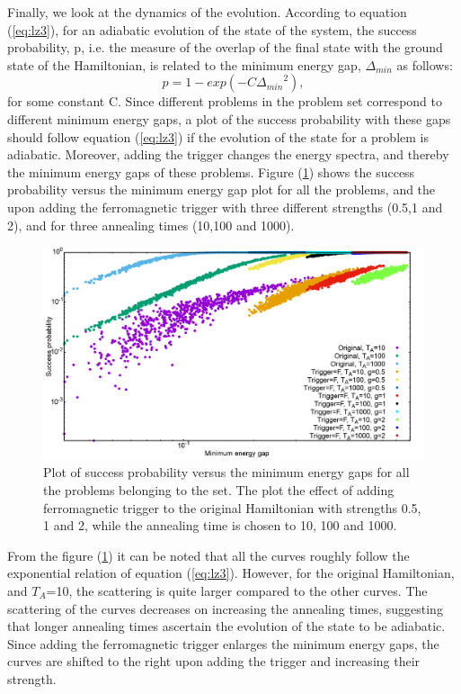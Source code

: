\documentclass[12]{article}
\begin{document}
Finally, we look at the dynamics of the evolution. According to equation (\ref{eq:lz3}), for an adiabatic evolution of the state of the system, the success probability, p, i.e. the measure of the overlap of the final state with the ground state of the Hamiltonian, is related to the minimum energy gap, $\Delta_{min}$ as follows:
\begin{equation}
p=1-exp(-C{\Delta_{min}}^2),
\end{equation}
for some constant C. Since different problems in the problem set correspond to different minimum energy gaps, a plot of the success probability with these gaps should follow equation (\ref{eq:lz3}) if the evolution of the state for a problem is adiabatic. Moreover, adding the trigger changes the energy spectra, and thereby the minimum energy gaps of these problems. Figure (\ref{fig:f14}) shows the success probability versus the minimum energy gap plot for all the problems, and the upon adding the ferromagnetic trigger with three different strengths (0.5,1 and 2), and for three annealing times (10,100 and 1000).

\begin{figure}[H]
\centering
\includegraphics[scale=0.3]{SuccVsGap_OF_g.png}
\caption{Plot of success probability versus the minimum energy gaps for all the problems belonging to the set. The plot the effect of adding ferromagnetic trigger to the original Hamiltonian with strengths 0.5, 1 and 2, while the annealing time is chosen to 10, 100 and 1000.}
\label{fig:f14}
\end{figure} 

From the figure (\ref{fig:f14}) it can be noted that all the curves roughly follow the exponential  relation of equation (\ref{eq:lz3}). However, for the original Hamiltonian, and $T_A$=10, the scattering is quite larger compared to the other curves. The scattering of the curves decreases on increasing the annealing times, suggesting that longer annealing times ascertain the evolution of the state to be adiabatic. Since adding the ferromagnetic trigger enlarges the minimum energy gaps, the curves are shifted to the right upon adding the trigger and increasing their strength. 
\end{document}
